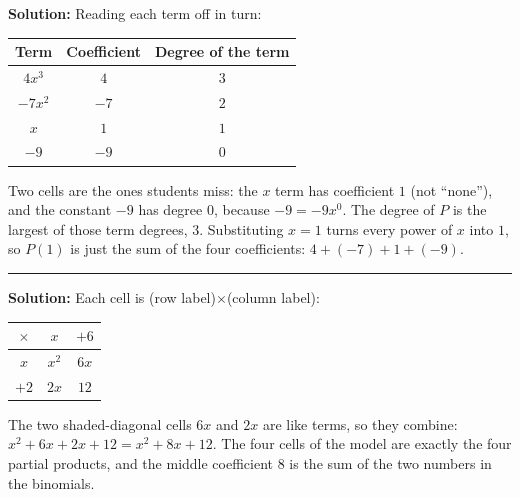 \documentclass[12pt]{article}
\begin{document}



\textbf{Solution:} \quad Reading each term off in turn:

\begin{center}
\begin{tabular}{|c|c|c|}
\hline
\textbf{Term} & \textbf{Coefficient} & \textbf{Degree of the term}\\
\hline
$4x^3$  & $4$  & $3$ \\\hline
$-7x^2$ & $-7$ & $2$ \\\hline
$x$     & $1$  & $1$ \\\hline
$-9$    & $-9$ & $0$ \\\hline
\end{tabular}
\end{center}

\noindent Two cells are the ones students miss: the $x$ term has coefficient $1$ (not
``none''), and the constant $-9$ has degree $0$, because $-9 = -9x^0$.
The degree of $P$ is the largest of those term degrees, $3$.
Substituting $x=1$ turns every power of $x$ into $1$, so $P(1)$ is just the sum of the
four coefficients: $4 + (-7) + 1 + (-9)$. 

\vspace{0.2cm}\noindent\rule{\linewidth}{0.2pt}


\textbf{Solution:} \quad Each cell is (row label)$\times$(column label):

\begin{center}
\begin{tabular}{|c|c|c|}
\hline
$\times$ & $x$ & $+6$ \\
\hline
$x$  & $x^2$ & $6x$ \\\hline
$+2$ & $2x$  & $12$ \\\hline
\end{tabular}
\end{center}

\noindent The two shaded-diagonal cells $6x$ and $2x$ are like terms, so they combine:
$x^2 + 6x + 2x + 12 = x^2 + 8x + 12$. The four cells of the model are exactly the four
partial products, and the middle coefficient $8$ is the sum of the two numbers in the
binomials. 
\end{document}

